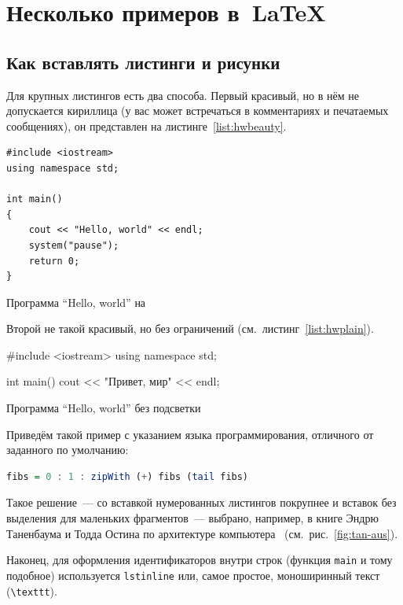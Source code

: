 \fi

\section{Несколько примеров в~\LaTeX{}}
\label{sec:examples}
\subsection{Как вставлять листинги и рисунки}
Для крупных листингов есть два способа. Первый красивый, но в нём не допускается
кириллица (у вас может встречаться в комментариях и
печатаемых сообщениях), он представлен на листинге~\ref{list:hwbeauty}.
\begin{ListingEnv}[H]%
\begin{lstlisting}
#include <iostream>
using namespace std;

int main()
{
    cout << "Hello, world" << endl;
    system("pause");
    return 0;
}
\end{lstlisting}
\caption{Программа “Hello, world” на \protect\cpp}\label{list:hwbeauty}
\end{ListingEnv}

Второй не такой красивый, но без ограничений (см.~листинг~\ref{list:hwplain}).
\begin{ListingEnv}[H]
\begin{Verb}

#include <iostream>
using namespace std;

int main()
{
    cout << "Привет, мир" << endl;
}
\end{Verb}
\caption{Программа “Hello, world” без подсветки}
\label{list:hwplain}
\end{ListingEnv}
 Приведём такой пример с указанием языка программирования, отличного от заданного по умолчанию:
\begin{lstlisting}[language=Haskell]
fibs = 0 : 1 : zipWith (+) fibs (tail fibs)
\end{lstlisting}
Такое решение~--- со вставкой нумерованных листингов покрупнее
и вставок без выделения для маленьких фрагментов~--- выбрано,
например, в книге Эндрю Таненбаума и Тодда Остина по архитектуре
компьютера~\autocite{TanAus2013} (см.~рис.~\ref{fig:tan-aus}).

Наконец, для оформления идентификаторов внутри строк
(функция \lstinline{main} и тому подобное) используется
\texttt{lstinline} или, самое простое, моноширинный текст
(\texttt{\textbackslash texttt}).

